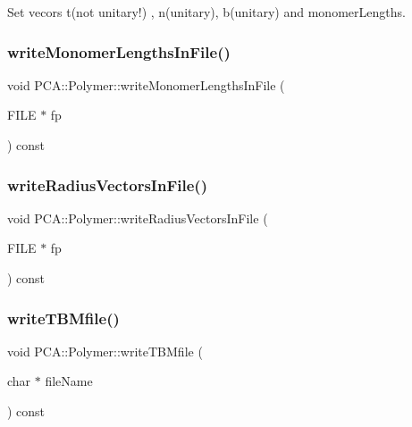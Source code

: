 Set vecors t(not unitary!) , n(unitary), b(unitary) and monomer\+Lengths. 

\hypertarget{class_p_c_a_1_1_polymer_a081b8e4d7cac0da6cc411c7b56ff7362}{}\label{class_p_c_a_1_1_polymer_a081b8e4d7cac0da6cc411c7b56ff7362} 
\subsubsection{\texorpdfstring{write\+Monomer\+Lengths\+In\+File()}{writeMonomerLengthsInFile()}}
{\footnotesize\ttfamily void P\+C\+A\+::\+Polymer\+::write\+Monomer\+Lengths\+In\+File (\begin{DoxyParamCaption}\item[{F\+I\+LE $\ast$}]{fp }\end{DoxyParamCaption}) const}

\hypertarget{class_p_c_a_1_1_polymer_a9859e587476da47e49cfee1152e93fa0}{}\label{class_p_c_a_1_1_polymer_a9859e587476da47e49cfee1152e93fa0} 
\subsubsection{\texorpdfstring{write\+Radius\+Vectors\+In\+File()}{writeRadiusVectorsInFile()}}
{\footnotesize\ttfamily void P\+C\+A\+::\+Polymer\+::write\+Radius\+Vectors\+In\+File (\begin{DoxyParamCaption}\item[{F\+I\+LE $\ast$}]{fp }\end{DoxyParamCaption}) const}

\hypertarget{class_p_c_a_1_1_polymer_ac89188a3e56684ff3313a43ff83abea0}{}\label{class_p_c_a_1_1_polymer_ac89188a3e56684ff3313a43ff83abea0} 
\subsubsection{\texorpdfstring{write\+T\+B\+Mfile()}{writeTBMfile()}}
{\footnotesize\ttfamily void P\+C\+A\+::\+Polymer\+::write\+T\+B\+Mfile (\begin{DoxyParamCaption}\item[{char $\ast$}]{file\+Name }\end{DoxyParamCaption}) const}



